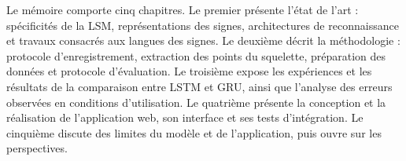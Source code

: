 \begin{introduction}
Le mémoire comporte cinq chapitres. Le premier présente l'état de l'art : spécificités de la LSM, représentations des signes, architectures de reconnaissance et travaux consacrés aux langues des signes. Le deuxième décrit la méthodologie : protocole d'enregistrement, extraction des points du squelette, préparation des données et protocole d'évaluation. Le troisième expose les expériences et les résultats de la comparaison entre LSTM et GRU, ainsi que l'analyse des erreurs observées en conditions d'utilisation. Le quatrième présente la conception et la réalisation de l'application web, son interface et ses tests d'intégration. Le cinquième discute des limites du modèle et de l'application, puis ouvre sur les perspectives.

\end{introduction}
